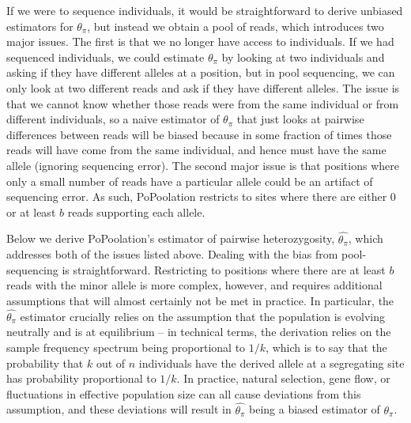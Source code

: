 \documentclass[a4paper,fontsize=9pt,DIV=14]{scrartcl}
\newcommand{\samplesize}{n}
\newcommand{\thetapi}{\widehat{\theta_\pi}}
\begin{document}
If we were to sequence individuals, it would be straightforward to derive unbiased estimators for $\theta_\pi$, but instead we obtain a pool of reads, which introduces two major issues.  The first is that we no longer have access to individuals.  If we had sequenced individuals, we could estimate $\theta_\pi$ by looking at two individuals and asking if they have different alleles at a position, but in pool sequencing, we can only look at two different reads and ask if they have different alleles.  The issue is that we cannot know whether those reads were from the same individual or from different individuals, so a naive estimator of $\theta_\pi$ that just looks at pairwise differences between reads will be biased because in some fraction of times those reads will have come from the same individual, and hence must have the same allele (ignoring sequencing error).  The second major issue is that positions where only a small number of reads have a particular allele could be an artifact of sequencing error.  As such, PoPoolation restricts to sites where there are either $0$ or at least $b$ reads supporting each allele.

Below we derive PoPoolation's estimator of pairwise heterozygosity, $\thetapi$, which addresses both of the issues listed above.  Dealing with the bias from pool-sequencing is straightforward.  Restricting to positions where there are at least $b$ reads with the minor allele is more complex, however, and requires additional assumptions that will almost certainly not be met in practice.  In particular, the $\thetapi$ estimator crucially relies on the assumption that the population is evolving neutrally and is at equilibrium -- in technical terms, the derivation relies on the sample frequency spectrum being proportional to $1/k$, which is to say that the probability that $k$ out of $\samplesize$ individuals have the derived allele at a segregating site has probability proportional to $1/k$.  In practice, natural selection, gene flow, or fluctuations in effective population size can all cause deviations from this assumption, and these deviations will result in $\thetapi$ being a biased estimator of $\theta_\pi$.


\end{document}
